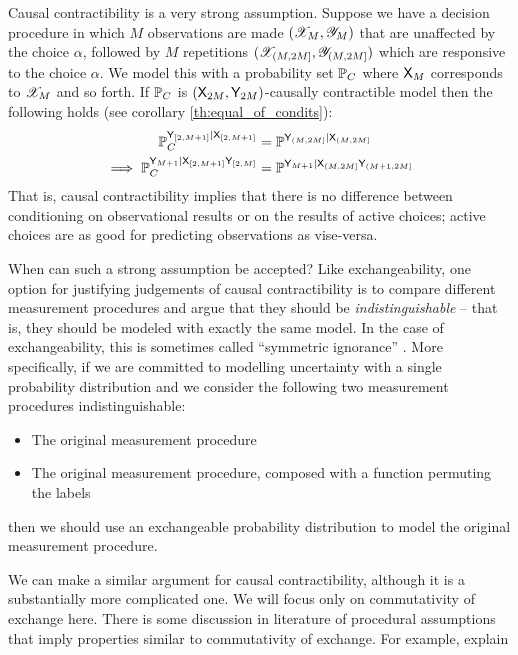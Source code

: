 Causal contractibility is a very strong assumption. Suppose we have a decision procedure in which $M$ observations are made $(\mathscr{X}_M,\mathscr{Y}_M)$ that are unaffected by the choice $\alpha$, followed by $M$ repetitions $(\mathscr{X}_{(M,2M]},\mathscr{Y}_{(M,2M]})$ which are responsive to the choice $\alpha$. We model this with a probability set $\mathbb{P}_C$ where $\mathsf{X}_M$ corresponds to $\mathscr{X}_M$ and so forth. If $\mathbb{P}_C$ is $(\mathsf{X}_{2M},\mathsf{Y}_{2M})$-causally contractible model then the following holds (see corollary \ref{th:equal_of_condits}):
\begin{align}
    \mathbb{P}^{\mathsf{Y}_{[2,M+1]}|\mathsf{X}_{[2,M+1]}}_C &= \mathbb{P}^{\mathsf{Y}_{(M,2M]}|\mathsf{X}_{(M,2M]}}\\
    \implies \mathbb{P}^{\mathsf{Y}_{M+1}|\mathsf{X}_{[2,M+1]}\mathsf{Y}_{[2,M]}}_C &= \mathbb{P}^{\mathsf{Y}_{M+1}|\mathsf{X}_{(M,2M]}\mathsf{Y}_{(M+1,2M]}}
\end{align}
That is, causal contractibility implies that there is no difference between conditioning on observational results or on the results of active choices; active choices are as good for predicting observations as vise-versa.

When can such a strong assumption be accepted? Like exchangeability, one option for justifying judgements of causal contractibility is to compare different measurement procedures and argue that they should be \emph{indistinguishable} -- that is, they should be modeled with exactly the same model. In the case of exchangeability, this is sometimes called ``symmetric ignorance'' \citet[chap. ~5]{gelman_bayesian_2021}. More specifically, if we are committed to modelling uncertainty with a single probability distribution and we consider the following two measurement procedures indistinguishable:
\begin{itemize}
    \item The original measurement procedure
    \item The original measurement procedure, composed with a function permuting the labels
\end{itemize}
then we should use an exchangeable probability distribution to model the original measurement procedure.

We can make a similar argument for causal contractibility, although it is a substantially more complicated one. We will focus only on commutativity of exchange here. There is some discussion in literature of procedural assumptions that imply properties similar to commutativity of exchange. For example, \citet{greenland_identifiability_1986} explain

